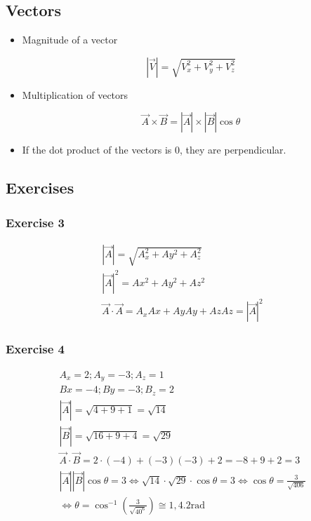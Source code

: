 \documentclass[../main.tex]{subfiles}
\begin{document}
\subsection{Vectors}
\begin{itemize}
    \item Magnitude of a vector 

        \begin{equation}
            |\vec{V}| = \sqrt{V_{x}^2 + V_{y}^2 + V_{z}^2}  
        \end{equation}

    \item Multiplication of vectors

        \begin{equation}
            \vec{A}\times \vec{B} = |\vec{A}|\times |\vec{B}| \cos{\theta}
        \end{equation}

    \item If the dot product of the vectors is $0$, they are perpendicular.
\end{itemize}

\subsection{Exercises}

\subsubsection{Exercise 3}

\begin{equation}
\begin{array}{l}
|\vec{A}|=\sqrt{A_{x}^{2}+A y^{2}+A_{z}^{2}} \\
|\vec{A}|^{2}=A x^{2}+A y^{2}+A z^{2} \\
\vec{A} \cdot \vec{A}=A_{x} A x+A y A y+A z A z=|\vec{A}|^{2}
\end{array}
\end{equation}

\subsubsection{Exercise 4}

\begin{equation}
\begin{array}{l}
A_{x}=2 ; A_{y}=-3 ; A_{z}=1\\
B x=-4 ; B y=-3 ; B_{z}=2\\
|\vec{A}|=\sqrt{4+9+1}=\sqrt{14}\\
|\vec{B}|=\sqrt{16+9+4}=\sqrt{29}\\
\vec{A} \cdot \vec{B}=2 \cdot(-4)+(-3)(-3)+2=-8+9+2=3\\
|\vec{A}||\vec{B}| \cos \theta=3 \Leftrightarrow \sqrt{14} \cdot \sqrt{29} \cdot \cos \theta=3 \Leftrightarrow \cos \theta=\frac{3}{\sqrt{406}}\\
\Leftrightarrow \theta=\cos ^{-1}\left(\frac{3}{\sqrt{40^{6}}}\right) \cong 1,4.2 \mathrm{rad}
\end{array}
\end{equation}
\end{document}
